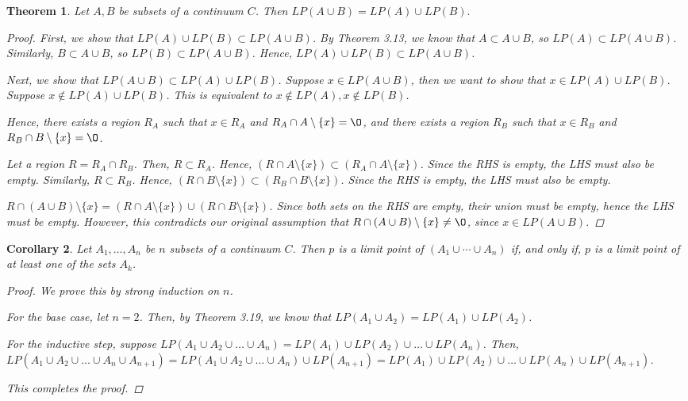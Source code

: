 \documentclass[11pt]{article}
\renewcommand{\emptyset}{\O}
\renewcommand{\_}[1]{\underline{ #1 }}
\newtheorem{theorem}{Theorem}[section]
\newtheorem{corollary}[theorem]{Corollary}
\theoremstyle{definition}
\numberwithin{equation}{subsection}
\begin{document}
\begin{theorem}  Let $A, B$ be subsets of a continuum $C$.  Then  $LP(A \cup B)=LP(A)\cup LP(B).$

\begin{proof}
First, we show that $LP(A) \cup LP(B) \subset LP(A \cup B)$. By Theorem 3.13, we know that $A \subset A \cup B$, so $LP(A) \subset LP(A\cup B)$. Similarly, $B \subset A \cup B$, so $LP(B) \subset LP(A\cup B)$. Hence, $LP(A) \cup LP(B) \subset LP(A\cup B)$.

Next, we show that $LP(A \cup B)  \subset LP(A) \cup LP(B)$.
Suppose $x \in LP(A \cup B)$, then we want to show that $x \in LP(A) \cup LP(B)$. Suppose $x \notin LP(A) \cup LP(B)$. This is equivalent to $x \notin LP(A), x \notin LP(B)$.

Hence, there exists a region $R_A$ such that $x \in R_A$ and $R_A \cap A \setminus \{x\} = \emptyset$, and there exists a region $R_B$ such that $x \in R_B$ and $R_B \cap B \setminus \{x\} = \emptyset$.

Let a region $R = R_A \cap R_B$. Then, $R \subset R_A$. Hence, $(R \cap A \setminus \{x\}) \subset (R_A \cap A \setminus \{x\})$. Since the RHS is empty, the LHS must also be empty. Similarly, $R \subset R_B$. Hence, $(R \cap B \setminus \{x\}) \subset (R_B \cap B \setminus \{x\})$. Since the RHS is empty, the LHS must also be empty.

$R \cap (A \cup B) \setminus \{x\} = (R \cap A \setminus \{x\}) \cup (R \cap B \setminus \{x\})$. Since both sets on the RHS are empty, their union must be empty, hence the LHS must be empty. However, this contradicts our original assumption that $R \cap (A \cup B) \setminus \{x\} \not= \emptyset$, since $x \in LP(A\cup B)$.


\renewcommand\qedsymbol{QED}
\end{proof}

\end{theorem}



\begin{corollary}
Let $A_1, \dotsc, A_n$ be $n$ subsets of a continuum $C$.  Then  $p$ is a limit point of $(A_1 \cup \dotsm \cup A_n)$ if, and only if, $p$ is a limit point of at least one of the sets $A_k$.

\begin{proof}
We prove this by strong induction on $n$.

For the base case, let $n=2$. Then, by Theorem 3.19, we know that $LP(A_1 \cup A_2) = LP(A_1) \cup LP(A_2)$.

For the inductive step, suppose $LP(A_1 \cup A_2 \cup \dots \cup A_n) = LP(A_1) \cup LP(A_2) \cup \dots \cup LP(A_n)$. Then, $LP(A_1 \cup A_2 \cup \dots \cup A_n \cup A_{n+1}) = LP(A_1 \cup A_2 \cup \dots \cup A_n) \cup LP(A_{n+1}) = LP(A_1) \cup LP(A_2) \cup \dots \cup LP(A_n) \cup LP(A_{n+1})$.

This completes the proof.

\renewcommand\qedsymbol{QED}
\end{proof}
\end{corollary}
\end{document}
